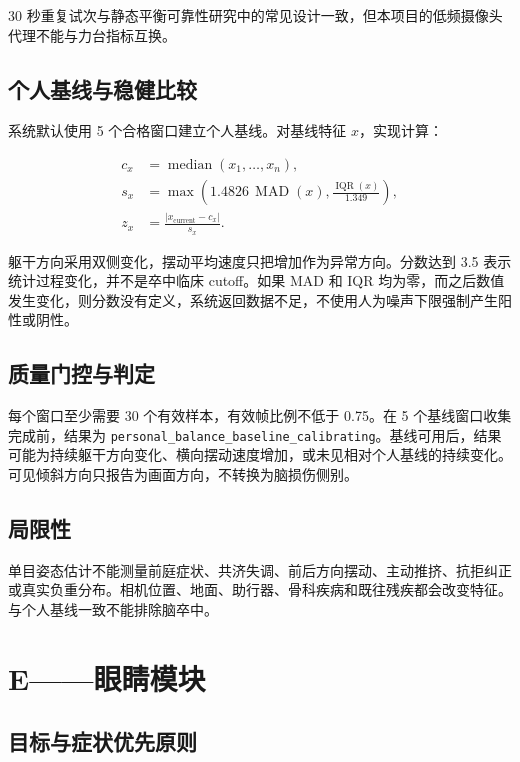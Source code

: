 \documentclass[11pt,a4paper]{article}
\begin{document}
30 秒重复试次与静态平衡可靠性研究中的常见设计一致，但本项目的低频摄像头代理不能与力台指标互换\cite{aryan2023forceplate,ruhe2010cop}。

\subsection{个人基线与稳健比较}

系统默认使用 5 个合格窗口建立个人基线。对基线特征 $x$，实现计算：

\begin{align}
c_x &= \operatorname{median}(x_1,\ldots,x_n), \\
s_x &= \max\left(1.4826\,\operatorname{MAD}(x),\frac{\operatorname{IQR}(x)}{1.349}\right), \\
z_x &= \frac{|x_{\mathrm{current}}-c_x|}{s_x}.
\end{align}

躯干方向采用双侧变化，摆动平均速度只把增加作为异常方向。分数达到 3.5 表示统计过程变化\cite{iglewicz1993outliers}，并不是卒中临床 cutoff。如果 MAD 和 IQR 均为零，而之后数值发生变化，则分数没有定义，系统返回数据不足，不使用人为噪声下限强制产生阳性或阴性。

\subsection{质量门控与判定}

每个窗口至少需要 30 个有效样本，有效帧比例不低于 0.75。在 5 个基线窗口收集完成前，结果为 \texttt{personal\_balance\_baseline\_calibrating}。基线可用后，结果可能为持续躯干方向变化、横向摆动速度增加，或未见相对个人基线的持续变化。可见倾斜方向只报告为画面方向，不转换为脑损伤侧别。

\subsection{局限性}

单目姿态估计不能测量前庭症状、共济失调、前后方向摆动、主动推挤、抗拒纠正或真实负重分布。相机位置、地面、助行器、骨科疾病和既往残疾都会改变特征。与个人基线一致不能排除脑卒中。

\section{E——眼睛模块}

\subsection{目标与症状优先原则}
\end{document}
